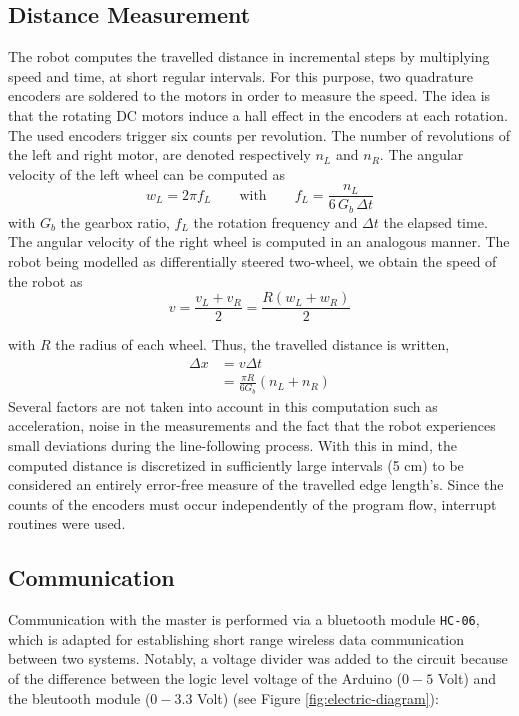 \documentclass[12pt]{report}
\begin{document}
\subsection*{Distance Measurement}
The robot computes the travelled distance in incremental steps by multiplying speed and time, at short regular intervals. For this purpose, two quadrature encoders are soldered to the motors in order to measure the speed. The idea is that the rotating DC motors induce a hall effect in the encoders at each rotation. The used encoders trigger six counts per revolution. The number of revolutions of the left and right motor, are denoted respectively $n_L$ and $n_R$. The angular velocity of the left wheel can be computed as
\begin{equation}
w_L = 2\pi f_L
\qquad\text{with}\qquad	
f_L = \frac{n_L}{6\, G_b \, \Delta{t} }
\end{equation}
with $G_b$ the gearbox ratio, $f_L$ the rotation frequency and $\Delta{t}$ the elapsed time. The angular velocity of the right wheel is computed in an analogous manner. The robot being modelled as differentially steered two-wheel, we obtain the speed of the robot as
\begin{equation}
v = \frac{v_L + v_R}{2} = \frac{R(w_L + w_R)}{2}
\end{equation}

with $R$ the radius of each wheel. Thus, the travelled distance is written,
\begin{align*}
\Delta{x} &= v\Delta{t}\\
&= \frac{\pi R}{6 G_b}(n_L + n_R)
\end{align*}
Several factors are not taken into account in this computation such as acceleration, noise in the measurements and the fact that the robot experiences small deviations during the line-following process. With this in mind, the computed distance is discretized in sufficiently large intervals (5 cm) to be considered an entirely error-free measure of the travelled edge length's. Since the counts of the encoders must occur independently of the program flow, interrupt routines were used.

\subsection*{Communication}
Communication with the master is performed via a bluetooth module \texttt{HC-06}, which is adapted for establishing short range wireless data communication between two systems. Notably, a voltage divider was added to the circuit because of the difference between the logic level voltage of the Arduino ($0-5$ Volt) and the bleutooth module ($0-3.3$ Volt) (see Figure \ref{fig:electric-diagram}):
\end{document}
